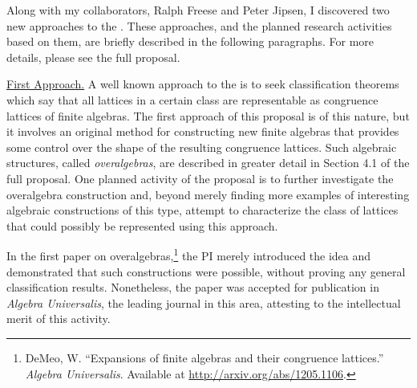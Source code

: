 
Along with my collaborators, Ralph Freese and Peter Jipsen, I discovered two new approaches to
the \flrp.
These approaches, and the planned research activities based on them,
are briefly described in the following paragraphs. For more details, please see the full
proposal.

\vskip2mm
\noindent \underline{First Approach.} A well known approach to the \flrp is %
to seek classification theorems which say that all
lattices in a certain class are representable as congruence lattices of finite
algebras.  The first approach of this proposal is of this nature, but it
involves an original method for constructing new finite algebras that provides some
control over the shape of the resulting congruence lattices.  Such algebraic
structures, called \emph{overalgebras}, are described in greater detail in
Section 4.1 of the full proposal. %
One planned activity of the proposal
is to further investigate the overalgebra construction and, beyond merely finding
more examples of interesting algebraic constructions of this type, attempt to characterize
the class of lattices that could possibly be represented using this approach.


\vskip2mm
 In the first paper on
overalgebras,\footnote{
DeMeo, W. ``Expansions of finite algebras and their congruence lattices.''
\emph{Algebra Universalis}. Available at \url{http://arxiv.org/abs/1205.1106}.}
the PI merely introduced the
idea and demonstrated that such constructions were possible, without proving any
general classification results.  Nonetheless, the paper was
accepted for publication in {\it Algebra Universalis}, the leading
journal in this area, attesting to the intellectual merit of this activity.


